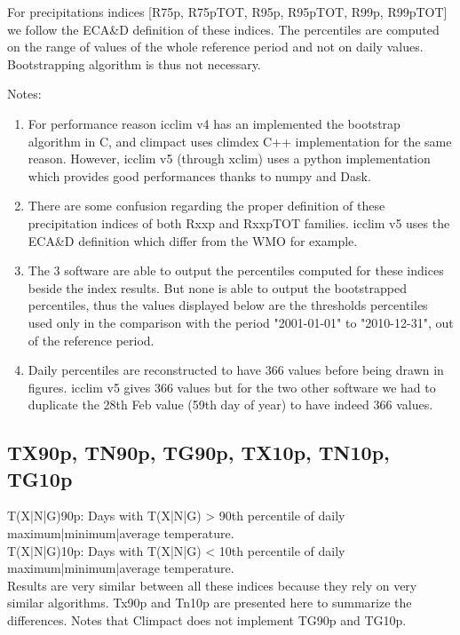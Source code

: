 \documentclass[a4paper,11pt]{article}
\begin{document}
        For precipitations indices [R75p, R75pTOT, R95p, R95pTOT, R99p, R99pTOT] we follow the ECA\&D definition of these indices.
        The percentiles are computed on the range of values of the whole reference period and not on daily values.
        Bootstrapping algorithm is thus not necessary.

        Notes:
        \begin{enumerate}
            \item For performance reason icclim v4 has an implemented the bootstrap algorithm in C, and climpact uses climdex C++ implementation for the same reason. However, icclim v5 (through xclim) uses a python implementation which provides good performances thanks to numpy and Dask.
            \item There are some confusion regarding the proper definition of these precipitation indices of both Rxxp and RxxpTOT families. icclim v5 uses the ECA\&D definition which differ from the WMO for example.
            \item The 3 software are able to output the percentiles computed for these indices beside the index results. But none is able to output the bootstrapped percentiles, thus the values displayed below are the thresholds percentiles used only in the comparison with the period "2001-01-01" to "2010-12-31", out of the reference period.
            \item Daily percentiles are reconstructed to have 366 values before being drawn in figures. icclim v5 gives 366 values but for the two other software we had to duplicate the 28th Feb value (59th day of year) to have indeed 366 values.
        \end{enumerate}

        \subsection{TX90p, TN90p, TG90p, TX10p, TN10p, TG10p}
            T(X|N|G)90p: Days with T(X|N|G) > 90th percentile of daily maximum|minimum|average temperature.\\
            T(X|N|G)10p: Days with T(X|N|G) < 10th percentile of daily maximum|minimum|average temperature.\\

            Results are very similar between all these indices because they rely on very similar algorithms. 
            Tx90p and Tn10p are presented here to summarize the differences.
            Notes that Climpact does not implement TG90p and TG10p.
\end{document}
